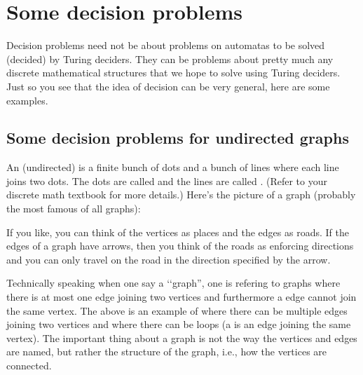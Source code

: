 \section{Some decision problems}

Decision problems need not be about problems on automatas to be solved
(decided) by Turing deciders.
They can be problems
about pretty much any discrete mathematical structures
that we hope to solve using Turing deciders.
Just so you see that the idea of decision can be
very general, here are some examples.

\newpage
\subsection{Some decision problems for undirected graphs}

  An (undirected)  is a finite bunch of dots and a bunch of lines where
  each line joins two dots.
  The dots are called  and the lines are called
  .
  (Refer to your discrete math textbook for more details.)
Here's the picture of a graph (probably the most famous of all graphs):
\begin{center}
\end{center}
If you like, you can think of the vertices as places and
the edges as roads.
If the edges of a graph have arrows, then you think of
the roads as enforcing directions and you can only travel on the road
in the direction specified by the arrow.

Technically speaking when one say a \lq\lq graph'', one is
refering to graphs where there is at most one edge joining
two vertices and furthermore a edge cannot join the same vertex.
The above is an example of 
where there can be multiple edges joining two vertices
and where there can be loops (a 
is an edge joining the same vertex).
The important thing about a graph
is not the way the vertices and edges are named,
but rather the structure of the graph, i.e.,
how the vertices are connected.

